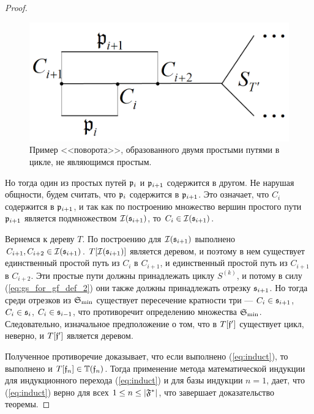 \begin{proof}
\begin{figure}[htb!]
\centering
\includegraphics[scale=1.0]{images/tree_turn.png}
\caption{Пример <<поворота>>, образованного двумя простыми путями в цикле, не являющимся простым.}
\label{fig:tree_turn}
\end{figure}

Но тогда один из простых путей $\mathfrak{p}_i$ и $\mathfrak{p}_{i+1}$ содержится в другом. Не нарушая общности, будем считать, что $\mathfrak{p}_i$ содержится в $\mathfrak{p}_{i+1}$. Это означает, что $C_i$ содержится в $\mathfrak{p}_{i + 1}$, и так как по построению множество вершин простого пути $\mathfrak{p}_{i + 1}$ является подмножеством $\mathcal{I}(\mathfrak{s}_{i + 1})$, то $C_i \in \mathcal{I}(\mathfrak{s}_{i + 1})$.

Вернемся к дереву $T$. По построению для $\mathcal{I}(\mathfrak{s}_{i + 1})$ выполнено $C_{i + 1}, C_{i + 2} \in \mathcal{I}(\mathfrak{s}_{i + 1})$. $T[\mathcal{I}(\mathfrak{s}_{i + 1})]$ является деревом, и поэтому в нем существует единственный простой путь из $C_i$ в $C_{i + 1}$, и единственный простой путь из $C_{i + 1}$ в $C_{i + 2}$. Эти простые пути должны принадлежать циклу $S^{(k)}$, и потому в силу (\ref{eq:gs_for_gf_def_2}) они также должны принадлежать отрезку $\mathfrak{s}_{i + 1}$. Но тогда среди отрезков из $\mathfrak{S}_{\min}$ существует пересечение кратности три --- $C_i \in \mathfrak{s}_{i + 1}$, $C_i \in \mathfrak{s}_{i}$, $C_i \in \mathfrak{s}_{i - 1}$, что противоречит определению множества $\mathfrak{S}_{\min}$. Следовательно, изначальное предположение о том, что в $T[\mathfrak{f}']$ существует цикл, неверно, и $T[\mathfrak{f}']$ является деревом. 

Полученное противоречие доказывает, что если выполнено (\ref{eq:induct}), то выполнено и $T[\mathfrak{f}_n] \in \mathbb{T}(\mathfrak{f}_n)$. Тогда применение метода математической индукции для индукционного перехода (\ref{eq:induct}) и для базы индукции $n = 1$, дает, что (\ref{eq:induct}) верно для всех $1 \le n \le |\mathfrak{F}^*|$, что завершает доказательство теоремы.
\end{proof}
\vspace{1cm}




